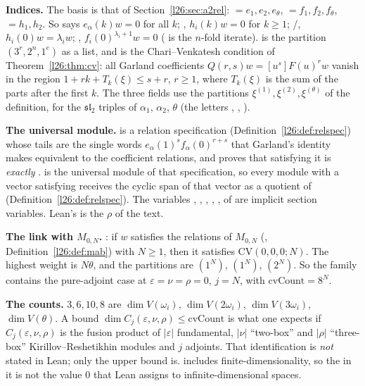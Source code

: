 \begin{dictionary}
\textbf{Indices.} The  basis is that of Section~\ref{l26:sec:a2rel}:  $=e_1,e_2,e_\theta$,
 $=f_1,f_2,f_\theta$,  $=h_1,h_2$. So  says $e_\alpha(k)w=0$ for all $k$;
, $h_i(k)w=0$ for $k\ge1$; /, $h_i(0)w=\lambda_iw$; ,
$f_i(0)^{\lambda_i+1}w=0$ ( is the $n$-fold iterate).  is the partition $(3^r,2^n,1^e)$ as a
list, and  is the Chari--Venkatesh condition of Theorem~\ref{l26:thm:cv}: all Garland coefficients
$Q(r,s)w=[u^s]F(u)^rw$ vanish in the region $1+rk+T_k(\xi)\le s+r$, $r\ge1$, where $T_k(\xi)$ is the sum of the parts after the
first $k$. The three  fields use the partitions $\xi^{(1)},\xi^{(2)},\xi^{(\theta)}$ of the definition, for the
$\mathfrak{sl}_2$ triples of $\alpha_1$, $\alpha_2$, $\theta$ (the letters , , ).

\textbf{The universal module.}  is a relation specification (Definition~\ref{l26:def:relspec}) whose tails
are the single words $e_\alpha(1)^sf_\alpha(0)^{r+s}$ that Garland's identity makes equivalent to the coefficient relations, and
 proves that satisfying it is \emph{exactly} .  is the universal module
 of that specification, so every module with a vector satisfying  receives the cyclic span of that vector
as a quotient of  (Definition~\ref{l26:def:relspec}). The variables , , , , ,
 of  are implicit section variables. Lean's  is the $\rho$ of the text.

\textbf{The link with $M_{0,N}$.} : if $w$ satisfies the relations of $M_{0,N}$ (,
Definition~\ref{l26:def:mab}) with $N\ge1$, then it satisfies $\mathrm{CV}(0,0,0;N)$. The highest weight is $N\theta$, and the
partitions are $(1^N)$, $(1^N)$, $(2^N)$. So the family contains the pure-adjoint case at $\varepsilon=\nu=\rho=0$, $j=N$, with
$\mathrm{cvCount}=8^N$.

\textbf{The counts.} $3,6,10,8$ are $\dim V(\omega_i)$, $\dim V(2\omega_i)$, $\dim V(3\omega_i)$, $\dim V(\theta)$. A bound
$\dim C_j(\varepsilon,\nu,\rho)\le\mathrm{cvCount}$ is what one expects if $C_j(\varepsilon,\nu,\rho)$ is the fusion product of
$|\varepsilon|$ fundamental, $|\nu|$ ``two-box'' and $|\rho|$ ``three-box'' Kirillov--Reshetikhin modules and $j$ adjoints.
That identification is \emph{not} stated in Lean; only the upper bound is.  includes finite-dimensionality, so
the  in it is not the value $0$ that Lean assigns to infinite-dimensional spaces.


\end{dictionary}
